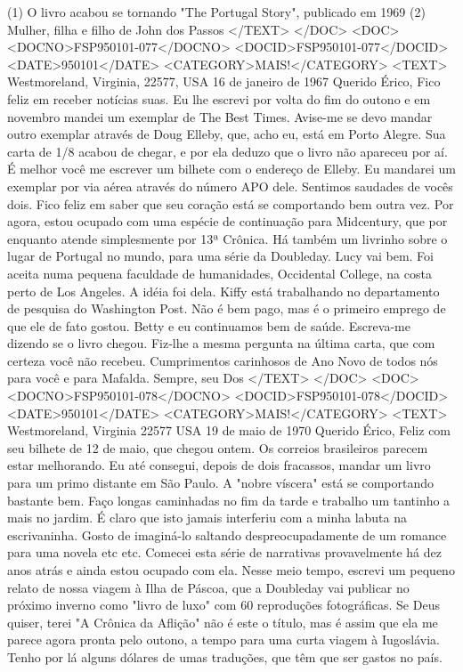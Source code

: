 (1) O livro acabou se tornando "The Portugal Story", publicado em 1969
(2) Mulher, filha e filho de John dos Passos
</TEXT>
</DOC>
<DOC>
<DOCNO>FSP950101-077</DOCNO>
<DOCID>FSP950101-077</DOCID>
<DATE>950101</DATE>
<CATEGORY>MAIS!</CATEGORY>
<TEXT>
Westmoreland, Virginia, 22577, USA
16 de janeiro de 1967
Querido Érico,
Fico feliz em receber notícias suas. Eu lhe escrevi por volta do fim do outono e em novembro mandei um exemplar de  The Best Times. Avise-me se devo mandar outro exemplar através de Doug Elleby, que, acho eu, está em Porto Alegre. Sua carta de 1/8 acabou de chegar, e por ela deduzo que o livro não apareceu por aí. É melhor você me escrever um bilhete com o endereço de Elleby. Eu mandarei um exemplar por via aérea através do número APO dele.
Sentimos saudades de vocês dois. Fico feliz em saber que seu coração está se comportando bem outra vez. Por agora, estou ocupado com uma espécie de continuação para  Midcentury, que por enquanto atende simplesmente por  13ª Crônica. Há também um livrinho sobre o lugar de Portugal no mundo, para uma série da Doubleday.
Lucy vai bem. Foi aceita numa pequena faculdade de humanidades, Occidental College, na costa perto de Los Angeles. A idéia foi dela. Kiffy está trabalhando no departamento de pesquisa do  Washington Post. Não é bem pago, mas é o primeiro emprego de que ele de fato gostou. Betty e eu continuamos bem de saúde.
Escreva-me dizendo se o livro chegou. Fiz-lhe a mesma pergunta na última carta, que com certeza você não recebeu.
Cumprimentos carinhosos de Ano Novo de todos nós para você e para Mafalda.
Sempre, seu
Dos
</TEXT>
</DOC>
<DOC>
<DOCNO>FSP950101-078</DOCNO>
<DOCID>FSP950101-078</DOCID>
<DATE>950101</DATE>
<CATEGORY>MAIS!</CATEGORY>
<TEXT>
Westmoreland, Virginia
22577 USA
19 de maio de 1970
Querido Érico,
Feliz com seu bilhete de 12 de maio, que chegou ontem. Os correios brasileiros parecem estar melhorando. Eu até consegui, depois de dois fracassos, mandar um livro para um primo distante em São Paulo.
A "nobre víscera" está se comportando bastante bem. Faço longas caminhadas no fim da tarde e trabalho um tantinho a mais no jardim. É claro que isto jamais interferiu com a minha labuta na escrivaninha. Gosto de imaginá-lo saltando despreocupadamente de um romance para uma novela etc etc. Comecei esta série de narrativas provavelmente há dez anos atrás e ainda estou ocupado com ela.
Nesse meio tempo, escrevi um pequeno relato de nossa viagem à Ilha de Páscoa, que a Doubleday vai publicar no próximo inverno como "livro de luxo" com 60 reproduções fotográficas.  Se Deus quiser, terei "A Crônica da Aflição" não é este o título, mas é assim que ela me parece agora pronta pelo outono, a tempo para uma curta viagem à Iugoslávia. Tenho por lá alguns dólares de umas traduções, que têm que ser gastos no país.
